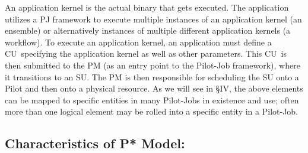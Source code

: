 \documentclass[conference,final]{IEEEtran}
\newcommand{\pilot}{Pilot\xspace}
\newcommand{\pilotjob}{Pilot-Job\xspace}
\newcommand{\pilotjobs}{Pilot-Jobs\xspace}
\newcommand{\cu}{CU\xspace}
\newcommand{\cus}{CUs\xspace}
\newcommand{\upp}{\vspace*{-0.5em}}
\begin{document}
\begin{compactitem}


\end{compactitem}


An application kernel is the actual binary that gets executed.  The
application utilizes a PJ framework to execute multiple instances of
an application kernel (an ensemble) or alternatively instances of
multiple different application kernels (a workflow).  To execute an
application kernel, an application must define a \cu \ specifying the
application kernel as well as other parameters. This \cu \ is then
submitted to the PM (as an entry point to the
\pilotjob framework), where it transitions to an SU. The PM is then
responsible for scheduling the SU onto a \pilot and then onto a
physical resource.  As we will see in \S{IV}, the above elements can
be mapped to specific entities in many \pilotjobs in existence and
use; often more than one logical element may be rolled into a specific
entity in a \pilotjob.

% 
% 


\subsection{Characteristics of P* Model:\upp\upp}
\label{sec:p_star_elements}
\end{document}
